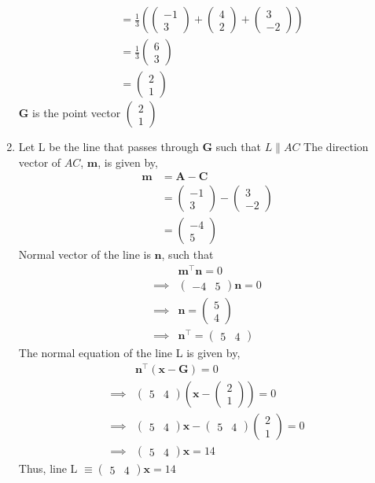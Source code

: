 \documentclass[journal,12pt,twocolumn]{IEEEtran}
\let\vec\mathbf
\providecommand{\brak}[1]{\ensuremath{\left(#1\right)}}
\newcommand{\myvec}[1]{\ensuremath{\begin{pmatrix}#1\end{pmatrix}}}
\begin{document}
\begin{enumerate}
\begin{align}
        &= \frac{1}{3}\brak{\myvec{-1 \\ 3} + \myvec{4 \\ 2} + \myvec{3 \\ -2}}
        \\
        &=\frac{1}{3}\myvec{6 \\ 3}
        \\
        &= \myvec{2 \\ 1}
    \end{align}
    $\vec{G}$ is the point vector $\myvec{2 \\ 1}$
\item Let L be the line that passes through $\vec{G}$ such that $L \parallel AC$
    The direction vector of $AC$, $\vec{m}$, is given by,
    \begin{align}
    \vec{m} &= \vec{A} - \vec{C}
    \\
	&= \myvec{-1 \\ 3} - \myvec{3 \\ -2}
	\\
	&= \myvec{-4 \\ 5}
    \end{align}
    Normal vector of the line is $\vec{n}$, such that
    \begin{align}
	&\vec{m}^{\top}\vec{n} = 0
	\\
	\implies &\myvec{-4 & 5}\vec{n} = 0
	\\
	\implies &\vec{n} = \myvec{5 \\ 4}
	\\
	\implies &\vec{n}^{\top} = \myvec{5 & 4}
    \end{align}
    The normal equation of the line L is given by, 
    \begin{align}
	&\vec{n}^{\top}\brak{\vec{x} - \vec{G}} = 0
	\\
	\implies &\myvec{5 & 4}\brak{\vec{x} - \myvec{2 \\ 1}} = 0
	\\
	\implies &\myvec{5 & 4}\vec{x} - \myvec{5 & 4}\myvec{2 \\ 1} = 0
	\\
	\implies &\myvec{5 & 4}\vec{x} = 14
    \end{align}
    Thus, line L $\equiv \myvec{5 & 4}\vec{x} = 14$
\end{enumerate}
\end{document}
